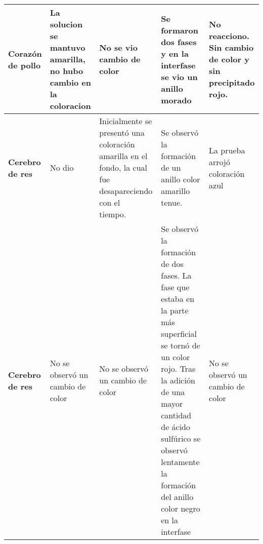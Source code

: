 \begin{table*}[h!]
\begin{tabular}{p{1.5cm}|p{3.5cm}p{3.5cm}p{3.5cm}p{3.5cm}}
		\textbf{Coraz\'on de pollo} & La solucion se mantuvo amarilla, no hubo cambio en la coloracion & No se vio cambio de color	& Se formaron dos fases y en la interfase se vio un anillo morado & No reacciono. Sin cambio de color y sin precipitado rojo.
		\\
		\hline
		
		\textbf{Cerebro de res} & No dio & Inicialmente se presentó una coloración amarilla en el fondo, la cual fue desapareciendo con el tiempo. & Se observó la formación de un anillo color amarillo tenue. & La prueba arrojó coloraci\'on azul
		\\
		\hline
		\textbf{Cerebro de res} & No se observó un cambio de color & No se observó un cambio de color & Se observó la formación de dos fases. La fase que estaba en la parte más superficial se tornó de un color rojo. Tras la adición de una mayor cantidad de ácido sulfúrico se observó lentamente la formación del anillo color negro en la interfase & No se observó un cambio de color
		\\
		\hline
	\end{tabular}
\end{table*}
